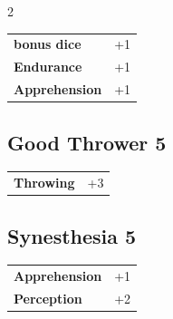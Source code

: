 \begin{multicols}{2}
\begin{tcolorbox}
\vspace{3mm}

\begin{tabular}{@{}ll@{}}
    \textbf{bonus dice} & +1\\
    \textbf{Endurance} & +1\\
    \textbf{Apprehension} & +1\\
\end{tabular}


\end{tcolorbox}

\begin{tcolorbox}
    \subsection*{Good Thrower \hfill \small{5 }}
    \tcblower




\begin{tabular}{@{}ll@{}}
    \textbf{Throwing} & +3\\
\end{tabular}


\end{tcolorbox}

\begin{tcolorbox}
    \subsection*{Synesthesia \hfill \small{5 }}
    \tcblower




\begin{tabular}{@{}ll@{}}
    \textbf{Apprehension} & +1\\
    \textbf{Perception} & +2\\
\end{tabular}


\end{tcolorbox}


\end{multicols}
